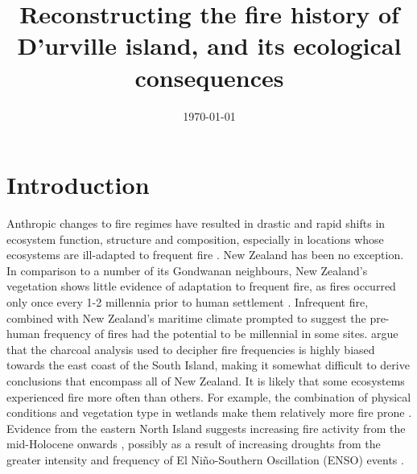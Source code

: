 \documentclass{article}
\title{Reconstructing the fire history of D'urville island, and its ecological consequences} %
\date{\today} %
\begin{document}
\maketitle


\section{Introduction}
Anthropic changes to fire regimes have resulted in drastic and rapid shifts in ecosystem function, structure and composition, especially in locations whose ecosystems are ill-adapted to frequent fire \citep{Mcwethy2013}. New Zealand has been no exception. In comparison to a number of its Gondwanan neighbours, New Zealand's vegetation shows little evidence of adaptation to frequent fire, as fires occurred only once every 1-2 millennia prior to human settlement \cite{OgdenJ}. Infrequent fire, combined with New Zealand's maritime climate prompted \cite{OgdenJ} to suggest the pre-human frequency of fires had the potential to be millennial in some sites. \cite{Perry2014} argue that the charcoal analysis used to decipher fire frequencies is highly biased towards the east coast of the South Island, making it somewhat difficult to derive conclusions that encompass all of New Zealand. It is likely that some ecosystems experienced fire more often than others. For example, the combination of physical conditions and vegetation type in wetlands make them relatively more fire prone \citep{Perry2014,mcglone2009postglacial, McGlone1983}. Evidence from the eastern North Island suggests increasing fire activity from the mid-Holocene onwards \citep {Horrocks2001,rogers2007frequency}, possibly as a result of increasing droughts from the greater intensity and frequency of El Ni\~{n}o-Southern Oscillation (ENSO) events \citep{Perry2014, mcglone1992nino}.
\end{document}
